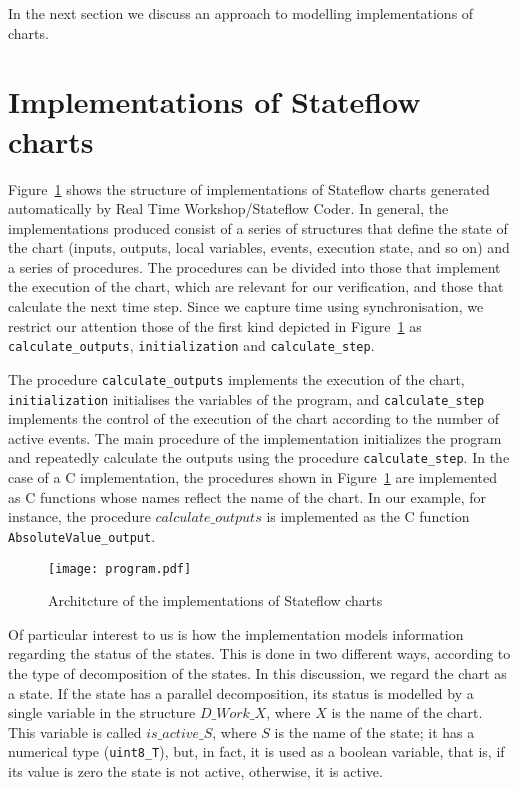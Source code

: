 \documentclass[submission]{eptcs}
\begin{document}
In the next section we discuss an approach to modelling implementations of charts.

\section{Implementations of Stateflow charts}
\label{sec:impl}

Figure~\ref{fig:impl} shows the structure of implementations of Stateflow charts generated automatically by Real Time Workshop/Stateflow Coder. In general, the implementations produced consist of a series of structures that define the state of the chart (inputs, outputs, local variables, events, execution state, and so on) and a series of procedures. The procedures can be divided into those that implement the execution of the chart, which are relevant for our verification, and those that calculate the next time step. Since we capture time using synchronisation, we restrict our attention those of the first kind depicted in Figure~\ref{fig:impl} as \texttt{calculate\_outputs}, \texttt{initialization} and \texttt{calculate\_step}.

The procedure \texttt{calculate\_outputs} implements the execution of the chart, \texttt{initialization} initialises the variables of the program, and \texttt{calculate\_step} implements the control of the execution of the chart according to the number of active events. The main procedure of the implementation initializes the program and repeatedly calculate the outputs using the procedure \texttt{calculate\_step}. In the case of a C implementation, the procedures shown in Figure~\ref{fig:impl} are implemented as C functions whose names reflect the name of the chart. In our example, for instance, the procedure $calculate\_outputs$ is implemented as the C function \texttt{AbsoluteValue\_output}.

\begin{figure}[t]
\centering
\texttt{[image: program.pdf]}
\caption{Architcture of the implementations of Stateflow charts}
\label{fig:impl}
\end{figure}

Of particular interest to us is how the implementation models information regarding the status of the states. This is done in two different ways, according to the type of
decomposition of the states. In this discussion, we regard the chart as a state. If the state has a parallel decomposition, its status is modelled by a single variable in the structure $D\_Work\_X$, where $X$ is the name of the chart. This variable is called $is\_active\_S$, where $S$ is the name of the state; it has a numerical type (\texttt{uint8\_T}), but, in fact, it is used as a boolean variable, that is, if its value is zero the state is not active, otherwise, it is active. 
\end{document}
